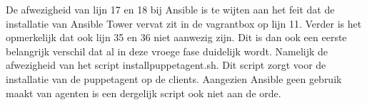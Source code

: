 De afwezigheid van lijn 17 en 18 bij Ansible is te wijten aan het feit dat de installatie van Ansible Tower vervat zit in de vagrantbox op lijn 11. Verder is het opmerkelijk dat ook lijn 35 en 36 niet aanwezig zijn. Dit is dan ook een eerste belangrijk verschil dat al in deze vroege fase duidelijk wordt. Namelijk de afwezigheid van het script installpuppetagent.sh. Dit script zorgt voor de installatie van de puppetagent op de clients. Aangezien Ansible geen gebruik maakt van agenten is een dergelijk script ook niet aan de orde.






















